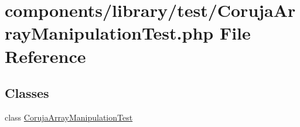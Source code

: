 \hypertarget{_coruja_array_manipulation_test_8php}{
\section{components/library/test/CorujaArrayManipulationTest.php File Reference}
\label{_coruja_array_manipulation_test_8php}
}
\subsection*{Classes}
\begin{CompactItemize}
\item 
class \hyperlink{class_coruja_array_manipulation_test}{CorujaArrayManipulationTest}
\end{CompactItemize}
